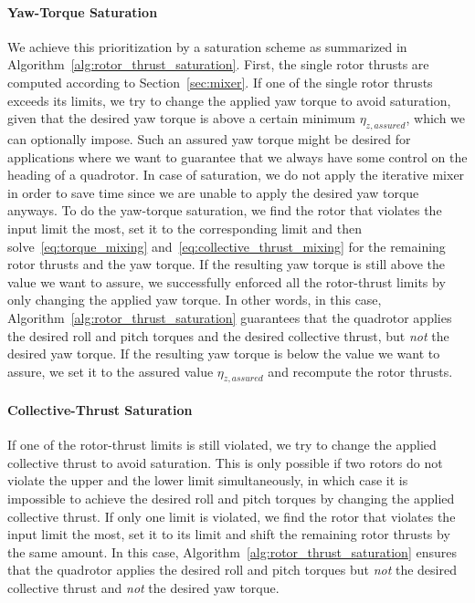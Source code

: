 \documentclass[12pt,a4paper,fleqn]{article}
\newcommand{\bodytorque}[0]{\eta}
\begin{document}
\paragraph{Yaw-Torque Saturation}

We achieve this prioritization by a saturation scheme as summarized in Algorithm~\ref{alg:rotor_thrust_saturation}.
First, the single rotor thrusts are computed according to Section~\ref{sec:mixer}.
If one of the single rotor thrusts exceeds its limits, we try to change the applied yaw torque to avoid saturation, given that the desired yaw torque is above a certain minimum $\bodytorque_{z,assured}$, which we can optionally impose.
Such an assured yaw torque might be desired for applications where we want to guarantee that we always have some control on the heading of a quadrotor.
In case of saturation, we do not apply the iterative mixer in order to save time since we are unable to apply the desired yaw torque anyways.
To do the yaw-torque saturation, we find the rotor that violates the input limit the most, set it to the corresponding limit and then solve~\eqref{eq:torque_mixing} and~\eqref{eq:collective_thrust_mixing} for the remaining rotor thrusts and the yaw torque.
If the resulting yaw torque is still above the value we want to assure, we successfully enforced all the rotor-thrust limits by only changing the applied yaw torque.
In other words, in this case, Algorithm~\ref{alg:rotor_thrust_saturation} guarantees that the quadrotor applies the desired roll and pitch torques and the desired collective thrust, but \emph{not} the desired yaw torque.
If the resulting yaw torque is below the value we want to assure, we set it to the assured value $\bodytorque_{z,assured}$ and recompute the rotor thrusts.

\paragraph{Collective-Thrust Saturation}

If one of the rotor-thrust limits is still violated, we try to change the applied collective thrust to avoid saturation.
This is only possible if two rotors do not violate the upper and the lower limit simultaneously, in which case it is impossible to achieve the desired roll and pitch torques by changing the applied collective thrust.
If only one limit is violated, we find the rotor that violates the input limit the most, set it to its limit and shift the remaining rotor thrusts by the same amount.
In this case, Algorithm~\ref{alg:rotor_thrust_saturation} ensures that the quadrotor applies the desired roll and pitch torques but \emph{not} the desired collective thrust and \emph{not} the desired yaw torque.
\end{document}
